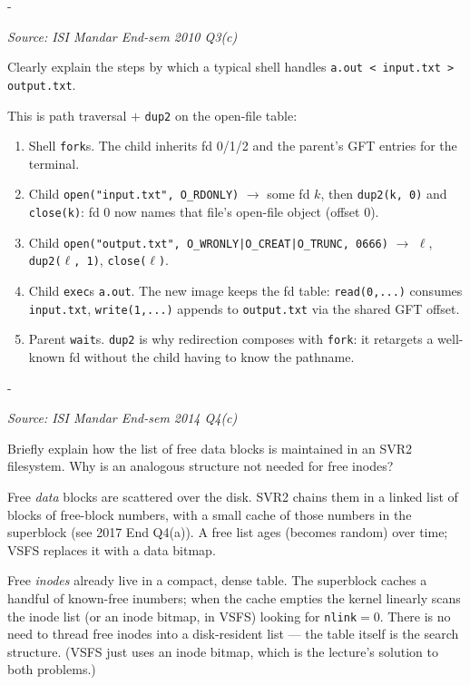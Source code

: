 \documentclass[11pt,a4paper]{article}
\makeatletter
\newcommand{\keepspace}[1]{\par\penalty-100\begingroup
  \setlength{\dimen@}{#1}\dimen@ii\pagegoal\advance\dimen@ii-\pagetotal
  \ifdim\dimen@>\dimen@ii\ifdim\dimen@ii>\z@\vfil\fi\break\fi\endgroup}
\newcounter{qn}[section]
\newenvironment{Qn}[4]{%
  \refstepcounter{qn}\keepspace{7\baselineskip}%
  \begin{tcolorbox}[qboxstyle, title={Q\thesection.\theqn\ \ [#1 \textbar\ #2]\ \ #4}]%
  {\footnotesize\color{g3}\textit{Source: #3}}\par\smallskip%
}{%
  \end{tcolorbox}%
}
\newenvironment{Sol}{%
  \begin{tcolorbox}[sboxstyle, title={Solution}]%
}{%
  \end{tcolorbox}\vspace{0.35em}%
}
\makeatother
\begin{document}
\begin{Qn}{Easy-Medium}{Lect 23}{ISI Mandar End-sem 2010 Q3(c)}{How the shell implements \texttt{a.out < in > out}}
Clearly explain the steps by which a typical shell handles
\texttt{a.out < input.txt > output.txt}.
\end{Qn}
\begin{Sol}
This is path traversal $+$ \texttt{dup2} on the open-file table:
\begin{enumerate}
\item Shell \texttt{fork}s. The child inherits fd 0/1/2 and the
      parent's GFT entries for the terminal.
\item Child \texttt{open("input.txt", O\_RDONLY)} $\to$ some fd
      $k$, then \texttt{dup2(k, 0)} and \texttt{close(k)}: fd 0
      now names that file's open-file object (offset 0).
\item Child \texttt{open("output.txt", O\_WRONLY|O\_CREAT|O\_TRUNC, 0666)}
      $\to$ $\ell$, \texttt{dup2($\ell$, 1)}, \texttt{close($\ell$)}.
\item Child \texttt{exec}s \texttt{a.out}. The new image keeps the
      fd table: \texttt{read(0,...)} consumes \texttt{input.txt},
      \texttt{write(1,...)} appends to \texttt{output.txt} via the
      shared GFT offset.
\item Parent \texttt{wait}s. \texttt{dup2} is why redirection
      composes with \texttt{fork}: it retargets a well-known fd
      without the child having to know the pathname.
\end{enumerate}
\end{Sol}

\begin{Qn}{Medium}{Lect 24}{ISI Mandar End-sem 2014 Q4(c)}{Why a free-block list but no free-inode list?}
Briefly explain how the list of free data blocks is maintained in
an SVR2 filesystem. Why is an analogous structure not needed for
free inodes?
\end{Qn}
\begin{Sol}
Free \emph{data} blocks are scattered over the disk. SVR2 chains
them in a linked list of blocks of free-block numbers, with a
small cache of those numbers in the superblock (see 2017 End
Q4(a)). A free list ages (becomes random) over time; VSFS
replaces it with a data bitmap.

Free \emph{inodes} already live in a compact, dense table. The
superblock caches a handful of known-free inumbers; when the
cache empties the kernel linearly scans the inode list (or an
inode bitmap, in VSFS) looking for \texttt{nlink}$=0$. There is
no need to thread free inodes into a disk-resident list --- the
table itself is the search structure. (VSFS just uses an inode
bitmap, which is the lecture's solution to both problems.)
\end{Sol}
\end{document}
